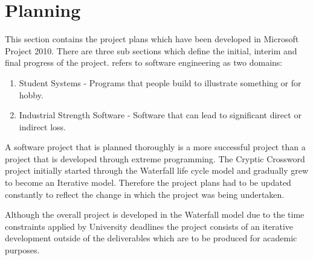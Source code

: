 \section{Planning}
\label{sec:planning}

This section contains the project plans which have been developed in Microsoft
Project 2010. There are three sub sections which define the initial, interim and
final progress of the project. \citet{planning05} refers to software engineering
as two domains:

\begin{enumerate}
  \item Student Systems - Programs that people build to illustrate something or 
        for hobby.
  \item Industrial Strength Software - Software that can lead to significant 
        direct or indirect loss.
\end{enumerate}

A software project that is planned thoroughly is a more successful project than
a project that is developed through extreme programming. The Cryptic Crossword
project initially started through the Waterfall life cycle model and gradually
grew to become an Iterative model. Therefore the project plans had to be updated
constantly to reflect the change in which the project was being undertaken.

Although the overall project is developed in the Waterfall model due to the time
constraints applied by University deadlines the project consists of an iterative
development outside of the deliverables which are to be produced for academic
purposes.


